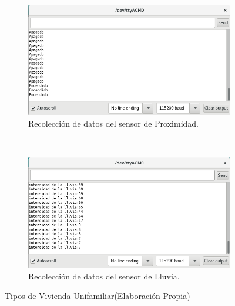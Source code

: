 \documentclass[11pt,letterpaper]{report}
\begin{document}
\begin{figure}[ht]
    \begin{subfigure}[b]{0.44\textwidth}
        \includegraphics[width=\textwidth]{imagenes/datosPIR2.png}
        \caption{Recolección de datos del sensor de Proximidad. }
        \label{fig:pir}
    \end{subfigure}
     ~ %
    \begin{subfigure}[b]{0.44\textwidth}
        \includegraphics[width=\textwidth]{imagenes/datosLluvia2.png}
        \caption{Recolección de datos del sensor de Lluvia. }
        \label{fig:lluvia}
    \end{subfigure}
    \caption{Tipos de Vivienda Unifamiliar(Elaboración Propia)}\label{fig:sensores}
\end{figure}	
\end{document}
